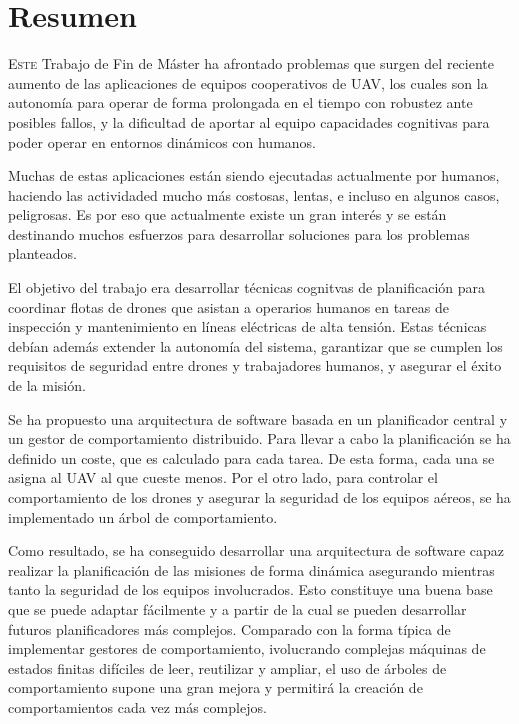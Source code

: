 \chapter*{Resumen}
\pagestyle{especial}
{}
\lettrine[lraise=-0.1, lines=2, loversize=0.2]{E}{ste} Trabajo de Fin de Máster ha afrontado problemas que surgen del reciente aumento de las aplicaciones de equipos cooperativos de \gls{UAV}, los cuales son la autonomía para operar de forma prolongada en el tiempo con robustez ante posibles fallos, y la dificultad de aportar al equipo capacidades cognitivas para poder operar en entornos dinámicos con humanos. 

Muchas de estas aplicaciones están siendo ejecutadas actualmente por humanos, haciendo las actividaded mucho más costosas, lentas, e incluso en algunos casos, peligrosas. Es por eso que actualmente existe un gran interés y se están destinando muchos esfuerzos para desarrollar soluciones para los problemas planteados.

El objetivo del trabajo era desarrollar técnicas cognitvas de planificación para coordinar flotas de drones que asistan a operarios humanos en tareas de inspección y mantenimiento en líneas eléctricas de alta tensión. Estas técnicas debían además extender la autonomía del sistema, garantizar que se cumplen los requisitos de seguridad entre drones y trabajadores humanos, y asegurar el éxito de la misión.

Se ha propuesto una arquitectura de software basada en un planificador central y un gestor de comportamiento distribuido. Para llevar a cabo la planificación se ha definido un coste, que es calculado para cada tarea. De esta forma, cada una se asigna al \gls{UAV} al que cueste menos. Por el otro lado, para controlar el comportamiento de los drones y asegurar la seguridad de los equipos aéreos, se ha implementado un árbol de comportamiento.

Como resultado, se ha conseguido desarrollar una arquitectura de software capaz realizar la planificación de las misiones de forma dinámica asegurando mientras tanto la seguridad de los equipos involucrados. Esto constituye una buena base que se puede adaptar fácilmente y a partir de la cual se pueden desarrollar futuros planificadores más complejos. Comparado con la forma típica de implementar gestores de comportamiento, ivolucrando complejas máquinas de estados finitas difíciles de leer, reutilizar y ampliar, el uso de árboles de comportamiento supone una gran mejora y permitirá la creación de comportamientos cada vez más complejos.
